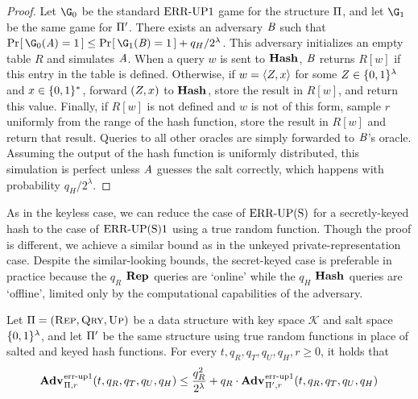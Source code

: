 \begin{proof}
Let $\G_0$ be the standard $\textnormal{ERR\mbox{-}UP}1$ game for the structure $\mathrm{\Pi}$, and let $\G_1$ be the same game for $\mathrm{\Pi}'$. There exists an adversary $\mathit{B}$ such that $\Prob{\G_0(\advA) = 1} \le \Prob{\G_1(\advB) = 1} + q_H/2^\lambda$. This adversary initializes an empty table $R$ and simulates $\mathit{A}$. When a query $w$ is sent to $\mathbf{Hash}\hspace{0.5pt}$, $\mathit{B}$ returns $R[w]$ if this entry in the table is defined. Otherwise, if $w = \langle Z, x\rangle$ for some $Z \in \{0,1\}^\lambda$ and $x \in \{0,1\}^*$, forward $(Z, x)$ to $\mathbf{Hash}\hspace{0.5pt}$, store the result in $R[w]$, and return this value. Finally, if $R[w]$ is not defined and $w$ is not of this form, sample $r$ uniformly from the range of the hash function, store the result in $R[w]$ and return that result. Queries to all other oracles are simply forwarded to $\mathit{B}$'s oracle. Assuming the output of the hash function is uniformly distributed, this simulation is perfect unless $\mathit{A}$ guesses the salt correctly, which happens with probability $q_H/2^\lambda$.\missingqed
\end{proof}


As in the keyless case, we can reduce the case of $\textnormal{ERR\mbox{-}UP(S)}$ for a secretly-keyed hash to the case of $\textnormal{ERR\mbox{-}UP(S)}1$ using a true random function. Though the proof is different, we achieve a similar bound as in the unkeyed private-representation case. Despite the similar-looking bounds, the secret-keyed case is preferable in practice because the $q_R$ $\mathbf{Rep}\hspace{0.5pt}$ queries are `online' while the $q_H$ $\mathbf{Hash}\hspace{0.5pt}$ queries are `offline', limited only by the computational capabilities of the adversary.

\begin{lemma}\label{lemma:keytorand}
  Let $\mathrm{\Pi} = (\textsc{Rep}, \textsc{Qry}, \textsc{Up})$ be a data structure with key space $\mathcal{K}$ and salt space $\{0,1\}^\lambda$, and let $\mathrm{\Pi}'$ be the same structure using true random functions in place of salted and keyed hash functions. For every $t, q_R, q_T, q_U, q_H, r \geq 0$, it holds that
  \[
    \Adv{\errep1}_{\struct,r}(t, q_R, q_T, q_U, q_H) \leq \frac{q_R^2}{2^\lambda} + q_R \cdot \Adv{\errep1}_{\struct',r}(t, q_R, q_T, q_U, q_H)
  \]
\end{lemma}

